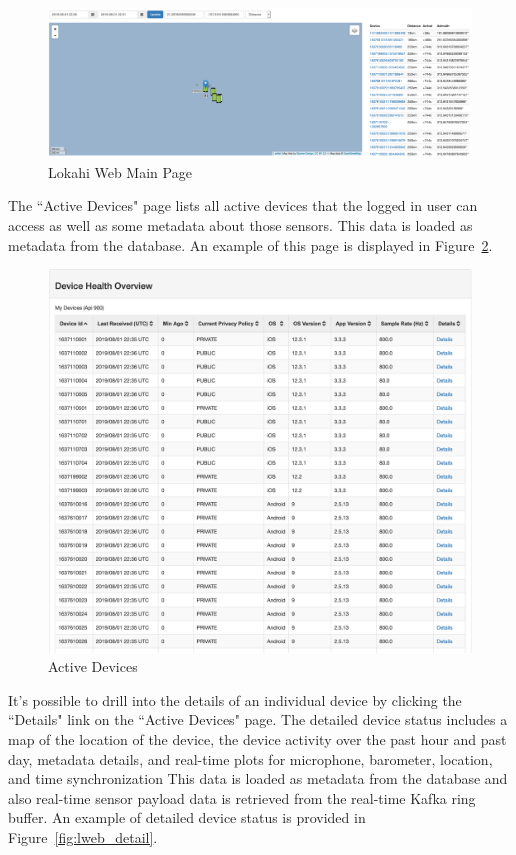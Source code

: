 \begin{figure}
	\centering
	\includegraphics[width=\linewidth]{figures/lweb_main.png}
	\caption{Lokahi Web Main Page}
	\label{fig:lweb_main}
\end{figure}

The ``Active Devices" page lists all active devices that the logged in user can access as well as some metadata about those sensors. This data is loaded as metadata from the database. An example of this page is displayed in Figure~\ref{fig:lweb_status}.

\begin{figure}
	\centering
	\includegraphics[width=\linewidth]{figures/lweb_status.png}
	\caption{Active Devices}
	\label{fig:lweb_status}
\end{figure}

It's possible to drill into the details of an individual device by clicking the ``Details" link on the ``Active Devices" page. The detailed device status includes a map of the location of the device, the device activity over the past hour and past day, metadata details, and real-time plots for microphone, barometer, location, and time synchronization This data is loaded as metadata from the database and also real-time sensor payload data is retrieved from the real-time Kafka ring buffer. An example of detailed device status is provided in Figure~\ref{fig:lweb_detail}.

